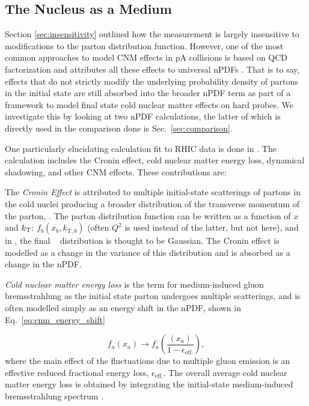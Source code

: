 {\subsection{The Nucleus as a Medium}
\label{compare_cnm}

Section \ref{sec:insensitivity} outlined how the measurement is largely insensitive to modifications to the parton distribution function. However, one of the most common approaches to model CNM effects in pA collisions is based on QCD factorization and attributes all these effects to universal nPDFs \cite{Kang2012,Eskola2009a,Hirai2007}. That is to say, effects that do not strictly modify the underlying probability density of partons in the initial state are still absorbed into the broader nPDF term as part of a framework to model final state cold nuclear matter effects on hard probes. We investigate this by looking at two nPDF calculations, the latter of which is directly used in the comparison done is Sec.~\ref{sec:comparison}.
 
One particularly elucidating calculation fit to RHIC data is done in \cite{Kang2012}. The calculation includes the Cronin effect, cold nuclear matter energy loss, dynamical shadowing, and other CNM effects. These contributions are: 

The \textit{Cronin Effect} is attributed to multiple initial-state scatterings of partons in the cold nuclei producing a broader distribution of the transverse momentum of the parton, \kt. The parton distribution function can be written as a function of $x$ and  $k_\mathrm{T}$: $f_{b}(x_b,k_{\mathrm{T},b})$ (often $Q^2$ is used instead of the latter, but not here), and in \cite{Kang2012}, the final \kt~ distribution is thought to be Gaussian. The Cronin effect is modelled as a change in the variance of this distribution and is absorbed as a change in the nPDF.

\textit{Cold nuclear matter energy loss} is the term for medium-induced gluon bremsstrahlung as the initial state parton undergoes multiple scatterings, and is often modelled simply as an energy shift in the nPDF, shown in Eq.~\ref{eq:cnm_energy_shift}

  \begin{equation}
    f_{a}(x_a) \rightarrow f_{a}(\frac{(x_a)}{1-\epsilon_\mathrm{eff.}}),
    \label{eq:cnm_energy_shift}
  \end{equation}
where the main effect of the fluctuations due to multiple gluon emission is an effective reduced fractional energy loss, $\epsilon_\mathrm{eff.}$. The overall average cold nuclear matter energy loss is obtained by integrating the initial-state medium-induced bremsstrahlung spectrum \cite{Vitev2007}. 

}
